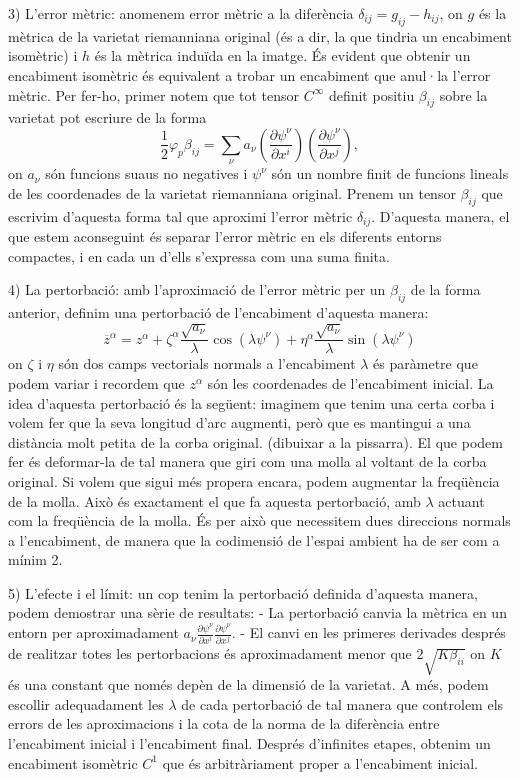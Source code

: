 3) L'error mètric: anomenem error mètric a la diferència $\delta_{ij} = g_{ij} - h_{ij}$, on $g$ és la mètrica de la varietat riemanniana original (és a dir, la que tindria un encabiment isomètric) i $h$ és la mètrica induïda en la imatge. És evident que obtenir un encabiment isomètric és equivalent a trobar un encabiment que anul·la l'error mètric. 
Per fer-ho, primer notem que tot tensor $C^\infty$ definit positiu $\beta_{ij}$ sobre la varietat pot escriure de la forma
\begin{equation}\label{eq:lema_descomp}
    \frac12\varphi_p\beta_{ij} = \sum_\nu a_\nu \left(\frac{\partial\psi^\nu}{\partial x^i}\right)\left(\frac{\partial\psi^\nu}{\partial x^j}\right),
\end{equation}
on $a_\nu$ són funcions suaus no negatives i $\psi^\nu$ són un nombre finit de funcions lineals de les coordenades de la varietat riemanniana original.
Prenem un tensor $\beta_{ij}$ que escrivim d'aquesta forma tal que aproximi l'error mètric $\delta_{ij}$. D'aquesta manera, el que estem aconseguint és separar l'error mètric en els diferents entorns compactes, i en cada un d'ells s'expressa com una suma finita.

4) La pertorbació: amb l'aproximació de l'error mètric per un $\beta_{ij}$ de la forma anterior, definim una pertorbació de l'encabiment d'aquesta manera:
\begin{equation*}
    \overline{z}^\alpha = z^\alpha + \zeta^\alpha\frac{\sqrt{a_\nu}}{\lambda}\cos(\lambda \psi^\nu) + \eta^\alpha\frac{\sqrt{a_\nu}}{\lambda}\sin(\lambda \psi^\nu)
\end{equation*}
on $\zeta$ i $\eta$ són dos camps vectorials normals a l'encabiment $\lambda$ és paràmetre que podem variar i recordem que $z^\alpha$ són les coordenades de l'encabiment inicial.
La idea d'aquesta pertorbació és la següent: imaginem que tenim una certa corba i volem fer que la seva longitud d'arc augmenti, però que es mantingui a una distància molt petita de la corba original. (dibuixar a la pissarra). El que podem fer és deformar-la de tal manera que giri com una molla al voltant de la corba original. Si volem que sigui més propera encara, podem augmentar la freqüència de la molla. 
Això és exactament el que fa aquesta pertorbació, amb $\lambda$ actuant com la freqüència de la molla. És per això que necessitem dues direccions normals a l'encabiment, de manera que la codimensió de l'espai ambient ha de ser com a mínim 2.

5) L'efecte i el límit: un cop tenim la pertorbació definida d'aquesta manera, podem demostrar una sèrie de resultats:
- La pertorbació canvia la mètrica en un entorn per aproximadament $a_\nu\frac{\partial\psi^\nu}{\partial x^i}\frac{\partial\psi^\nu}{\partial x^j}$.
- El canvi en les primeres derivades després de realitzar totes les pertorbacions és aproximadament menor que $2\sqrt{K\beta_{ii}}$ on $K$ és una constant que només depèn de la dimensió de la varietat.
A més, podem escollir adequadament les $\lambda$ de cada pertorbació de tal manera que controlem els errors de les aproximacions i la cota de la norma de la diferència entre l'encabiment inicial i l'encabiment final.
Després d'infinites etapes, obtenim un encabiment isomètric $C^1$ que és arbitràriament proper a l'encabiment inicial.

